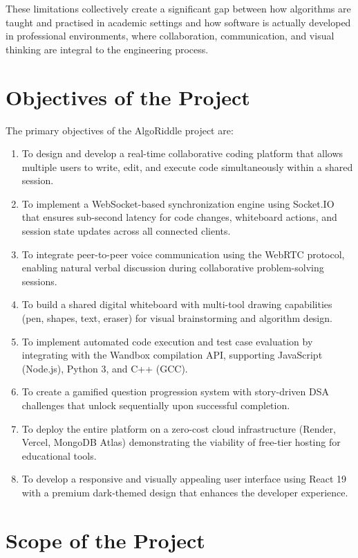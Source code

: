 These limitations collectively create a significant gap between how algorithms are taught and practised in academic settings and how software is actually developed in professional environments, where collaboration, communication, and visual thinking are integral to the engineering process.

\section{Objectives of the Project}

The primary objectives of the AlgoRiddle project are:

\begin{enumerate}[label=\arabic*.]
    \item To design and develop a real-time collaborative coding platform that allows multiple users to write, edit, and execute code simultaneously within a shared session.
    \item To implement a WebSocket-based synchronization engine using Socket.IO that ensures sub-second latency for code changes, whiteboard actions, and session state updates across all connected clients.
    \item To integrate peer-to-peer voice communication using the WebRTC protocol, enabling natural verbal discussion during collaborative problem-solving sessions.
    \item To build a shared digital whiteboard with multi-tool drawing capabilities (pen, shapes, text, eraser) for visual brainstorming and algorithm design.
    \item To implement automated code execution and test case evaluation by integrating with the Wandbox compilation API, supporting JavaScript (Node.js), Python 3, and C++ (GCC).
    \item To create a gamified question progression system with story-driven DSA challenges that unlock sequentially upon successful completion.
    \item To deploy the entire platform on a zero-cost cloud infrastructure (Render, Vercel, MongoDB Atlas) demonstrating the viability of free-tier hosting for educational tools.
    \item To develop a responsive and visually appealing user interface using React 19 with a premium dark-themed design that enhances the developer experience.
\end{enumerate}

\section{Scope of the Project}

